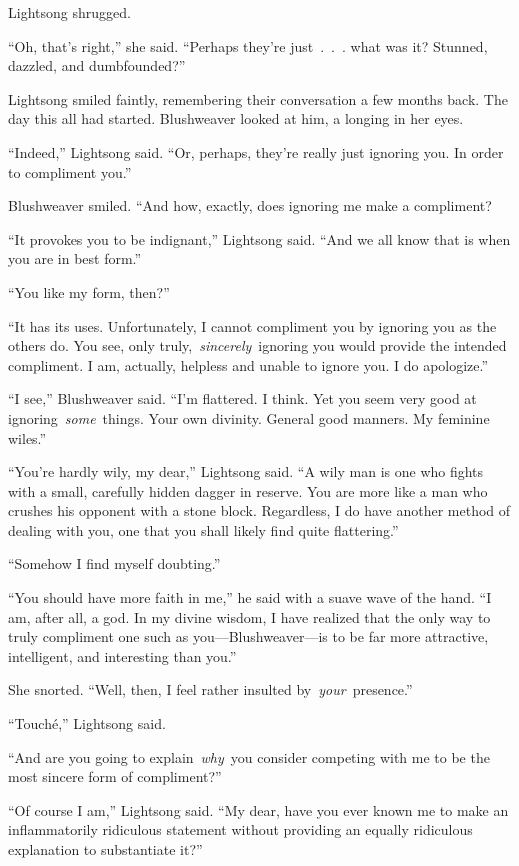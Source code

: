 Lightsong shrugged.

“Oh, that’s right,” she said. “Perhaps they’re just~.~.~. what was it? Stunned, dazzled, and dumbfounded?”

Lightsong smiled faintly, remembering their conversation a few months back. The day this all had started. Blushweaver looked at him, a longing in her eyes.

“Indeed,” Lightsong said. “Or, perhaps, they’re really just ignoring you. In order to compliment you.”

Blushweaver smiled. “And how, exactly, does ignoring me make a compliment?

“It provokes you to be indignant,” Lightsong said. “And we all know that is when you are in best form.”

“You like my form, then?”

“It has its uses. Unfortunately, I cannot compliment you by ignoring you as the others do. You see, only truly,~\textit{sincerely}~ignoring you would provide the intended compliment. I am, actually, helpless and unable to ignore you. I do apologize.”

“I see,” Blushweaver said. “I’m flattered. I think. Yet you seem very good at ignoring~\textit{some}~things. Your own divinity. General good manners. My feminine wiles.”

“You’re hardly wily, my dear,” Lightsong said. “A wily man is one who fights with a small, carefully hidden dagger in reserve. You are more like a man who crushes his opponent with a stone block. Regardless, I do have another method of dealing with you, one that you shall likely find quite flattering.”

“Somehow I find myself doubting.”

“You should have more faith in me,” he said with a suave wave of the hand. “I am, after all, a god. In my divine wisdom, I have realized that the only way to truly compliment one such as you—Blushweaver—is to be far more attractive, intelligent, and interesting than you.”

She snorted. “Well, then, I feel rather insulted by~\textit{your}~presence.”

“Touché,” Lightsong said.

“And are you going to explain~\textit{why}~you consider competing with me to be the most sincere form of compliment?”

“Of course I am,” Lightsong said. “My dear, have you ever known me to make an inflammatorily ridiculous statement without providing an equally ridiculous explanation to substantiate it?”

